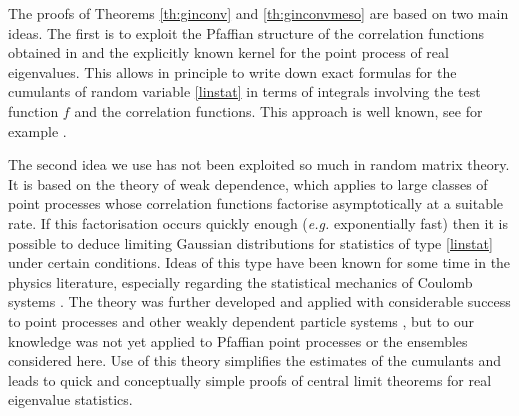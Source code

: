 \documentclass[11pt,reqno]{amsproc}
\numberwithin{equation}{section}
\numberwithin{theorem}{section}
\begin{document}

The proofs of Theorems \ref{th:ginconv} and \ref{th:ginconvmeso} are based on two main ideas. The first is to exploit the Pfaffian structure of the correlation functions obtained in \cite{FI16} and the explicitly known kernel for the point process of real eigenvalues. This allows in principle to write down exact formulas for the cumulants of random variable \eqref{linstat} in terms of integrals involving the test function $f$ and the correlation functions. This approach is well known, see for example \cite{S00}. 

The second idea we use has not been exploited so much in random matrix theory. It is based on the theory of weak dependence, which applies to large classes of point processes whose correlation functions factorise asymptotically at a suitable rate. If this factorisation occurs quickly enough (\textit{e.g.} exponentially fast) then it is possible to deduce limiting Gaussian distributions for statistics of type \eqref{linstat} under certain conditions. Ideas of this type have been known for some time in the physics literature, especially regarding the statistical mechanics of Coulomb systems \cite{MY80}. The theory was further developed and applied with considerable success to point processes and other weakly dependent particle systems \cite{IV82, GF18, NS12,BYY19}, but to our knowledge was not yet applied to Pfaffian point processes or the ensembles considered here. Use of this theory simplifies the estimates of the cumulants and leads to quick and conceptually simple proofs of central limit theorems for real eigenvalue statistics.
\end{document}
